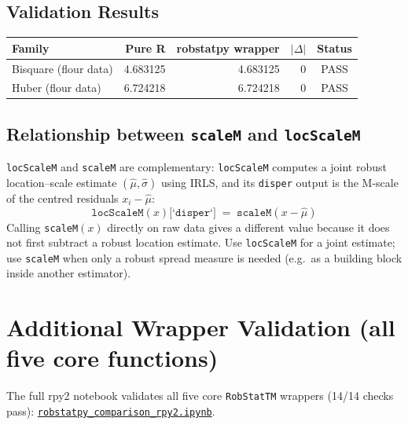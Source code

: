 \documentclass[11pt]{article}
\begin{document}
\subsection{Validation Results}

\renewcommand{\arraystretch}{1.25}
\begin{tabularx}{\linewidth}{@{} l r r r c @{}}
  \toprule
  \textbf{Family} & \textbf{Pure R} & \textbf{robstatpy wrapper}
    & \textbf{$|\Delta|$} & \textbf{Status} \\
  \midrule
  Bisquare (flour data) & 4.683125 & 4.683125 & $0$ & PASS \\
  Huber    (flour data) & 6.724218 & 6.724218 & $0$ & PASS \\
  \bottomrule
\end{tabularx}
\renewcommand{\arraystretch}{1}

\subsection{Relationship between \texttt{scaleM} and \texttt{locScaleM}}

\texttt{locScaleM} and \texttt{scaleM} are complementary:
\texttt{locScaleM} computes a joint robust location--scale estimate
$(\hat\mu, \hat\sigma)$ using IRLS, and its \texttt{disper} output is
the M-scale of the centred residuals $x_i - \hat\mu$:
\[
  \texttt{locScaleM}(x)\texttt{[`disper`]}
  \;=\; \texttt{scaleM}(x - \hat\mu)
\]
Calling \texttt{scaleM}$(x)$ directly on raw data gives a different
value because it does not first subtract a robust location estimate.
Use \texttt{locScaleM} for a joint estimate; use \texttt{scaleM}
when only a robust spread measure is needed (e.g.\ as a building
block inside another estimator).

\section{Additional Wrapper Validation (all five core functions)}

The full rpy2 notebook validates all five core \texttt{RobStatTM}
wrappers (14/14 checks pass):
\href{https://github.com/Aakarsh751/robstattm-pyport-AG-prop/blob/main/robstattm/python/robstatpy_comparison_rpy2.ipynb}%
{\texttt{robstatpy\_comparison\_rpy2.ipynb}}.
\end{document}
